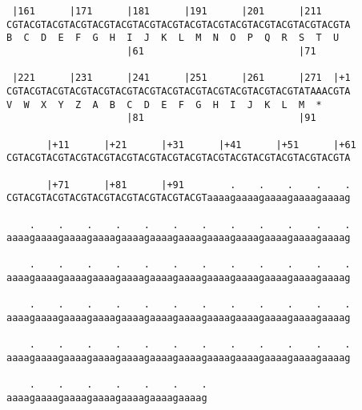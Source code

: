 \documentclass{article}
\begin{document}
\begin{Verbatim}
 |161      |171      |181      |191      |201      |211     
CGTACGTACGTACGTACGTACGTACGTACGTACGTACGTACGTACGTACGTACGTACGTA
B  C  D  E  F  G  H  I  J  K  L  M  N  O  P  Q  R  S  T  U  
                     |61                           |71      
  
 |221      |231      |241      |251      |261      |271  |+1
CGTACGTACGTACGTACGTACGTACGTACGTACGTACGTACGTACGTACGTATAAACGTA
V  W  X  Y  Z  A  B  C  D  E  F  G  H  I  J  K  L  M  *   
                     |81                           |91      
  
       |+11      |+21      |+31      |+41      |+51      |+61
CGTACGTACGTACGTACGTACGTACGTACGTACGTACGTACGTACGTACGTACGTACGTA
                                                            
       |+71      |+81      |+91        .    .    .    .    .
CGTACGTACGTACGTACGTACGTACGTACGTACGTaaaagaaaagaaaagaaaagaaaag
                                                            
    .    .    .    .    .    .    .    .    .    .    .    .
aaaagaaaagaaaagaaaagaaaagaaaagaaaagaaaagaaaagaaaagaaaagaaaag
                                                            
    .    .    .    .    .    .    .    .    .    .    .    .
aaaagaaaagaaaagaaaagaaaagaaaagaaaagaaaagaaaagaaaagaaaagaaaag
                                                            
    .    .    .    .    .    .    .    .    .    .    .    .
aaaagaaaagaaaagaaaagaaaagaaaagaaaagaaaagaaaagaaaagaaaagaaaag
                                                            
    .    .    .    .    .    .    .    .    .    .    .    .
aaaagaaaagaaaagaaaagaaaagaaaagaaaagaaaagaaaagaaaagaaaagaaaag
                                                            
    .    .    .    .    .    .    . 
aaaagaaaagaaaagaaaagaaaagaaaagaaaag

                                   
                                    
\end{Verbatim}
\end{document}
